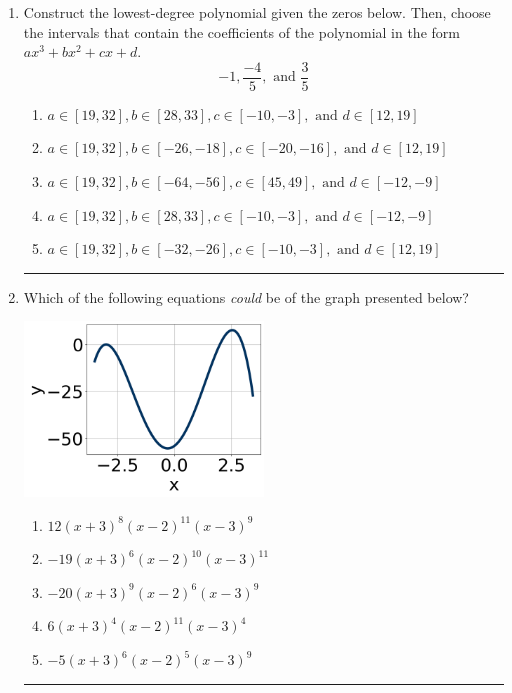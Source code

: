 \documentclass[14pt]{extbook}
\newcommand{\litem}[1]{\item#1\hspace*{-1cm}\rule{\textwidth}{0.4pt}}
\begin{document}
\begin{enumerate}
{\begin{enumerate}[label=\Alph*.]
\end{enumerate} }
\litem{
Construct the lowest-degree polynomial given the zeros below. Then, choose the intervals that contain the coefficients of the polynomial in the form $ax^3+bx^2+cx+d$.\[ -1, \frac{-4}{5}, \text{ and } \frac{3}{5} \]\begin{enumerate}[label=\Alph*.]
\item \( a \in [19, 32], b \in [28, 33], c \in [-10, -3], \text{ and } d \in [12, 19] \)
\item \( a \in [19, 32], b \in [-26, -18], c \in [-20, -16], \text{ and } d \in [12, 19] \)
\item \( a \in [19, 32], b \in [-64, -56], c \in [45, 49], \text{ and } d \in [-12, -9] \)
\item \( a \in [19, 32], b \in [28, 33], c \in [-10, -3], \text{ and } d \in [-12, -9] \)
\item \( a \in [19, 32], b \in [-32, -26], c \in [-10, -3], \text{ and } d \in [12, 19] \)

\end{enumerate} }
\litem{
Which of the following equations \textit{could} be of the graph presented below?
\begin{center}
    \includegraphics[width=0.5\textwidth]{../Figures/polyGraphToFunctionCopyB.png}
\end{center}
\begin{enumerate}[label=\Alph*.]
\item \( 12(x + 3)^{8} (x - 2)^{11} (x - 3)^{9} \)
\item \( -19(x + 3)^{6} (x - 2)^{10} (x - 3)^{11} \)
\item \( -20(x + 3)^{9} (x - 2)^{6} (x - 3)^{9} \)
\item \( 6(x + 3)^{4} (x - 2)^{11} (x - 3)^{4} \)
\item \( -5(x + 3)^{6} (x - 2)^{5} (x - 3)^{9} \)


\end{enumerate}}
\end{enumerate}
\end{document}

